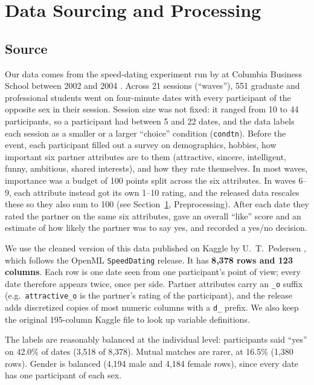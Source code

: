 \documentclass{article}
\begin{document}
\section{Data Sourcing and Processing}
\label{sec:data}

\subsection{Source}

Our data comes from the speed-dating experiment run by
\citet{fisman2006gender} at Columbia Business School between 2002 and 2004
\citep{fisman2006data}. Across 21 sessions (``waves''), 551 graduate and
professional students went on four-minute dates with every participant of the
opposite sex in their session. Session size was not fixed: it ranged from 10 to
44 participants, so a participant had between 5 and 22 dates, and the data
labels each session as a smaller or a larger ``choice'' condition
(\texttt{condtn}). Before the event, each participant filled out a
survey on demographics, hobbies, how important six partner attributes are to
them (attractive, sincere, intelligent, funny, ambitious, shared interests),
and how they rate themselves. In most waves, importance was a budget of 100
points split across the six attributes. In waves 6--9, each attribute instead
got its own 1--10 rating, and the released data rescales these so they also sum
to 100 (see Section~\ref{sec:data}, Preprocessing). After each date they rated the
partner on the same six attributes, gave an overall ``like'' score and an
estimate of how likely the partner was to say yes, and recorded a yes/no
decision.

We use the cleaned version of this data published on Kaggle by
U.~T.~Pedersen \citep{pedersen_kaggle}, which follows the OpenML
\texttt{SpeedDating} release. It has \textbf{8,378 rows and 123 columns}. Each row
is one date seen from one participant's point of view; every date therefore
appears twice, once per side. Partner attributes carry an \texttt{\_o} suffix
(e.g.\ \texttt{attractive\_o} is the partner's rating of the participant), and
the release adds discretized copies of most numeric columns with a
\texttt{d\_} prefix. We also keep the original 195-column Kaggle file
\citep{annavictoria_kaggle} to look up variable definitions.

The labels are reasonably balanced at the individual level:
participants said ``yes'' on 42.0\% of dates
(3,518 of 8,378). Mutual matches are rarer, at 16.5\% (1,380 rows). Gender is
balanced (4,194 male and 4,184 female rows), since every date has one participant of
each sex.
\end{document}
